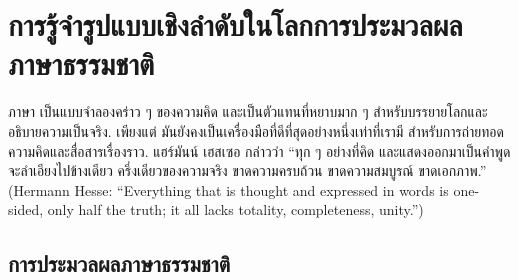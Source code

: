 \chapter{การรู้จำรูปแบบเชิงลำดับในโลกการประมวลผลภาษาธรรมชาติ}
\label{chapter: NLP}

\begin{Parallel}[c]{0.48\textwidth}{0.42\textwidth}
\end{Parallel}
\vspace{0.5cm}


ภาษา เป็นแบบจำลองคร่าว ๆ ของความคิด และเป็นตัวแทนที่หยาบมาก ๆ สำหรับบรรยายโลกและอธิบายความเป็นจริง.
เพียงแต่ มันยังคงเป็นเครื่องมือที่ดีที่สุดอย่างหนึ่งเท่าที่เรามี สำหรับการถ่ายทอดความคิดและสื่อสารเรื่องราว.
แฮร์มันน์ เฮสเซอ กล่าวว่า ``ทุก ๆ อย่างที่คิด และแสดงออกมาเป็นคำพูด จะลำเอียงไปข้างเดียว ครึ่งเดียวของความจริง ขาดความครบถ้วน ขาดความสมบูรณ์ ขาดเอกภาพ.'' (Hermann Hesse: ``Everything that is thought and expressed in words is one-sided, only half the truth; it all lacks totality, completeness, unity.'')


\section{การประมวลผลภาษาธรรมชาติ}

